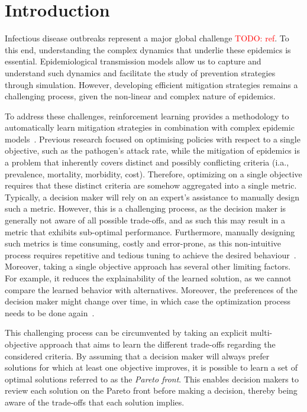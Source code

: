 \documentclass{article}
\renewcommand{\cite}[1]{\citep{#1}}
\newcommand\todo[1]{\textcolor{red}{TODO: #1}}
\begin{document}
\section{Introduction}
Infectious disease outbreaks represent a major global challenge \todo{ref}. To this end, understanding the complex dynamics that underlie these epidemics is essential. Epidemiological transmission models allow us to capture and understand such dynamics and facilitate the study of prevention strategies through simulation. However, developing efficient mitigation strategies remains a challenging process, given the non-linear and complex nature of epidemics. 

To address these challenges, reinforcement learning provides a methodology to automatically learn mitigation strategies in combination with complex epidemic models~\cite{libin2020}.
Previous research focused on optimising policies with respect to a single objective, such as the pathogen's attack rate, while the mitigation of epidemics is a problem that inherently covers distinct  and possibly conflicting criteria (i.a., prevalence, mortality, morbidity, cost). Therefore, optimizing on a single objective requires that  these distinct criteria are somehow aggregated into a single metric.
Typically, a decision maker will rely on an expert's assistance to manually design such a metric. However, this is a challenging process, as the decision maker is generally not aware of all possible trade-offs, and as such this may result in a metric that exhibits sub-optimal performance. Furthermore, manually designing such metrics is time consuming, costly and error-prone, as this non-intuitive process requires repetitive and tedious tuning to achieve the desired behaviour~\cite{roijers2013survey}. Moreover, taking a single objective approach has several other limiting factors. For example, it reduces the explainability of the learned solution, as we cannot compare the learned behavior with alternatives. Moreover, the preferences of the decision maker might change over time, in which case the optimization process needs to be done again~\cite{hayes2021practical}. 

This challenging process can be circumvented by taking an explicit multi-objective approach that aims to learn the different trade-offs regarding the considered criteria. By assuming that a decision maker will always prefer solutions for which at least one objective improves, it is possible to learn a set of optimal solutions referred to as the \emph{Pareto front}. This enables decision makers to review each solution on the Pareto front before making a decision, thereby being aware of the trade-offs that each solution implies. 
\end{document}
